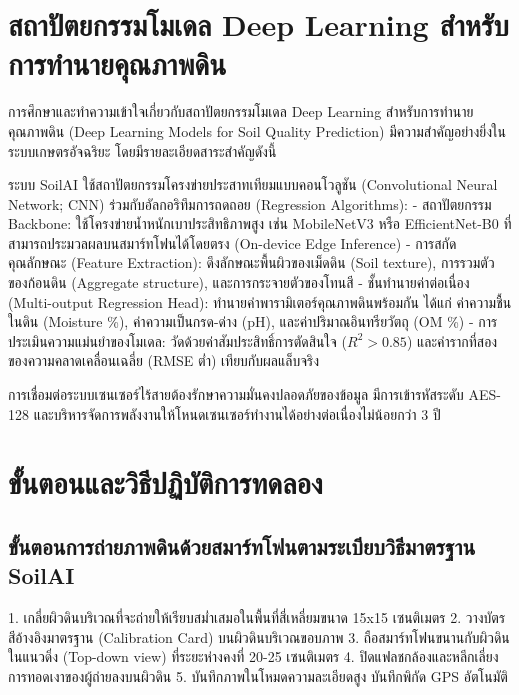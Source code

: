 \section{สถาปัตยกรรมโมเดล Deep Learning สำหรับการทำนายคุณภาพดิน}

การศึกษาและทำความเข้าใจเกี่ยวกับสถาปัตยกรรมโมเดล Deep Learning สำหรับการทำนายคุณภาพดิน (Deep Learning Models for Soil Quality Prediction) มีความสำคัญอย่างยิ่งในระบบเกษตรอัจฉริยะ โดยมีรายละเอียดสาระสำคัญดังนี้

ระบบ SoilAI ใช้สถาปัตยกรรมโครงข่ายประสาทเทียมแบบคอนโวลูชัน (Convolutional Neural Network; CNN) ร่วมกับอัลกอริทึมการถดถอย (Regression Algorithms):
- สถาปัตยกรรม Backbone: ใช้โครงข่ายน้ำหนักเบาประสิทธิภาพสูง เช่น MobileNetV3 หรือ EfficientNet-B0 ที่สามารถประมวลผลบนสมาร์ทโฟนได้โดยตรง (On-device Edge Inference)
- การสกัดคุณลักษณะ (Feature Extraction): ดึงลักษณะพื้นผิวของเม็ดดิน (Soil texture), การรวมตัวของก้อนดิน (Aggregate structure), และการกระจายตัวของโทนสี
- ชั้นทำนายค่าต่อเนื่อง (Multi-output Regression Head): ทำนายค่าพารามิเตอร์คุณภาพดินพร้อมกัน ได้แก่ ค่าความชื้นในดิน (Moisture \%), ค่าความเป็นกรด-ด่าง (pH), และค่าปริมาณอินทรียวัตถุ (OM \%)
- การประเมินความแม่นยำของโมเดล: วัดด้วยค่าสัมประสิทธิ์การตัดสินใจ ($R^2 > 0.85$) และค่ารากที่สองของความคลาดเคลื่อนเฉลี่ย (RMSE ต่ำ) เทียบกับผลแล็บจริง

\begin{techbox}
การเชื่อมต่อระบบเซนเซอร์ไร้สายต้องรักษาความมั่นคงปลอดภัยของข้อมูล มีการเข้ารหัสระดับ AES-128 และบริหารจัดการพลังงานให้โหนดเซนเซอร์ทำงานได้อย่างต่อเนื่องไม่น้อยกว่า 3 ปี
\end{techbox}

\section{ขั้นตอนและวิธีปฏิบัติการทดลอง}

\subsection{ขั้นตอนการถ่ายภาพดินด้วยสมาร์ทโฟนตามระเบียบวิธีมาตรฐาน SoilAI}
\begin{sensorbox}
1. เกลี่ยผิวดินบริเวณที่จะถ่ายให้เรียบสม่ำเสมอในพื้นที่สี่เหลี่ยมขนาด 15x15 เซนติเมตร
2. วางบัตรสีอ้างอิงมาตรฐาน (Calibration Card) บนผิวดินบริเวณขอบภาพ
3. ถือสมาร์ทโฟนขนานกับผิวดินในแนวดิ่ง (Top-down view) ที่ระยะห่างคงที่ 20-25 เซนติเมตร
4. ปิดแฟลชกล้องและหลีกเลี่ยงการทอดเงาของผู้ถ่ายลงบนผิวดิน
5. บันทึกภาพในโหมดความละเอียดสูง บันทึกพิกัด GPS อัตโนมัติ
\end{sensorbox}

